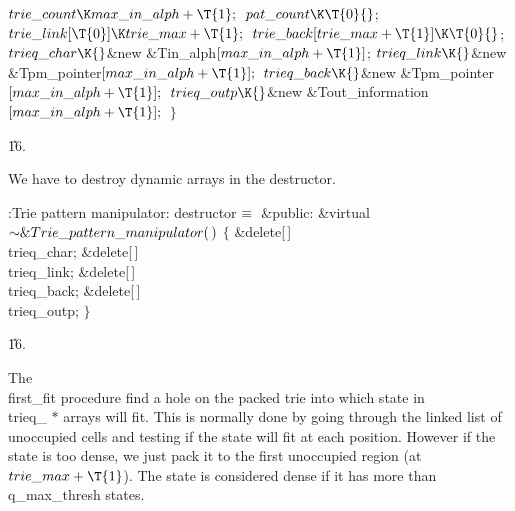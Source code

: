 ${}\\{trie\_count}\K\\{max\_in\_alph}+\T{1};{}$\6
${}\\{pat\_count}\K\T{0}{}$;\7
${}\\{trie\_link}[\T{0}]\K\\{trie\_max}+\T{1};{}$\6
${}\\{trie\_back}[\\{trie\_max}+\T{1}]\K\T{0}{}$;\7
${}\\{trieq\_char}\K{}$\&{new} \&{Tin\_alph}${}[\\{max\_in\_alph}+\T{1}]{}$;%
\6
${}\\{trieq\_link}\K{}$\&{new} \&{Tpm\_pointer}${}[\\{max\_in\_alph}+\T{1}];{}$%
\6
${}\\{trieq\_back}\K{}$\&{new} \&{Tpm\_pointer}${}[\\{max\_in\_alph}+\T{1}];{}$%
\6
${}\\{trieq\_outp}\K{}$\&{new} \&{Tout\_information}${}[\\{max\_in\_alph}+%
\T{1}];{}$\6
\4${}\}{}$\2\par
\U16.\fi

We have to destroy dynamic arrays in the destructor.

\Y\B\4:Trie pattern manipulator: destructor\X${}\equiv{}$\6
\4\&{public}:\6
\&{virtual} ${}{\sim}\&{Trie\_pattern\_manipulator}(\,){}$\1\1\2\2\6
${}\{{}$\1\6
\&{delete}[\,] \\{trieq\_char};\6
\&{delete}[\,] \\{trieq\_link};\6
\&{delete}[\,] \\{trieq\_back};\6
\&{delete}[\,] \\{trieq\_outp};\6
\4${}\}{}$\2\par
\U16.\fi

The \\{first\_fit} procedure find a hole on the packed trie into which
state in \\{trieq\_} $*$ arrays will fit. This is normally done by going
through the linked list of unoccupied cells and testing if the state
will fit at each position. However if the state is too dense, we just
pack it to the first unoccupied region (at $\\{trie\_max}+\T{1}$). The state is
considered dense if it has more than \\{q\_max\_thresh} states.

